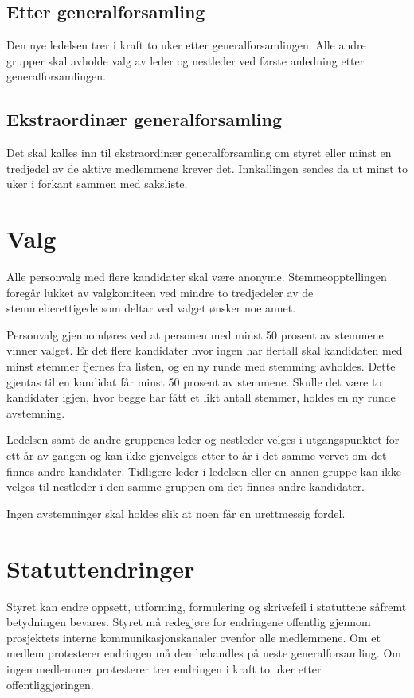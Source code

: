 \subsection{Etter generalforsamling}\label{sec:generalforsamling:etter}
Den nye ledelsen trer i kraft to uker etter generalforsamlingen.
Alle andre grupper skal avholde valg av leder og nestleder ved første anledning etter generalforsamlingen.

\subsection{Ekstraordinær generalforsamling}\label{sec:generalforsamling:ekstraordinær}
Det skal kalles inn til ekstraordinær generalforsamling om styret eller minst en tredjedel av de aktive medlemmene krever det.
Innkallingen sendes da ut minst to uker i forkant sammen med saksliste.


\section{Valg}\label{sec:valg}
Alle personvalg med flere kandidater skal være anonyme.
Stemmeopptellingen foregår lukket av valgkomiteen ved mindre to tredjedeler av de stemmeberettigede som deltar ved valget ønsker noe annet.

Personvalg gjennomføres ved at personen med minst 50 prosent av stemmene vinner valget.
Er det flere kandidater hvor ingen har flertall skal kandidaten med minst stemmer fjernes fra listen, og en ny runde med stemming avholdes.
Dette gjentas til en kandidat får minst 50 prosent av stemmene.
Skulle det være to kandidater igjen, hvor begge har fått et likt antall stemmer, holdes en ny runde avstemning. 

Ledelsen samt de andre gruppenes leder og nestleder velges i utgangspunktet for ett år av gangen og kan ikke gjenvelges etter to år i det samme vervet om det finnes andre kandidater.
Tidligere leder i ledelsen eller en annen gruppe kan ikke velges til nestleder i den samme gruppen om det finnes andre kandidater.

Ingen avstemninger skal holdes slik at noen får en urettmessig fordel.


\section{Statuttendringer}\label{sec:statuttendringer}
Styret kan endre oppsett, utforming, formulering og skrivefeil i statuttene såfremt betydningen bevares.
Styret må redegjøre for endringene offentlig gjennom prosjektets interne kommunikasjonskanaler ovenfor alle medlemmene.
Om et medlem protesterer endringen må den behandles på neste generalforsamling.
Om ingen medlemmer protesterer trer endringen i kraft to uker etter offentliggjøringen.


